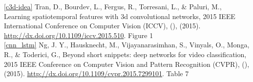 \documentclass[11pt]{article}
\begin{document}
\ref{c3d-idea} Tran, D., Bourdev, L., Fergus, R., Torresani, L., \& Paluri, M., Learning spatiotemporal features with 3d convolutional networks, 2015 IEEE International Conference on Computer Vision (ICCV), (),  (2015).  \url{http://dx.doi.org/10.1109/iccv.2015.510}. Figure 1\\

\ref{cnn_lstm} Ng, J. Y., Hausknecht, M., Vijayanarasimhan, S., Vinyals, O., Monga, R., \& Toderici, G., Beyond short snippets: deep networks for video classification, 2015 IEEE Conference on Computer Vision and Pattern Recognition (CVPR), (),  (2015).  \url{http://dx.doi.org/10.1109/cvpr.2015.7299101}. Table 7\\
\\
\\
\end{document}
